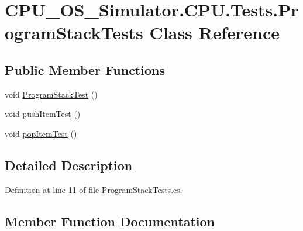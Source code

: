 \hypertarget{class_c_p_u___o_s___simulator_1_1_c_p_u_1_1_tests_1_1_program_stack_tests}{}\section{C\+P\+U\+\_\+\+O\+S\+\_\+\+Simulator.\+C\+P\+U.\+Tests.\+Program\+Stack\+Tests Class Reference}
\label{class_c_p_u___o_s___simulator_1_1_c_p_u_1_1_tests_1_1_program_stack_tests}
\subsection*{Public Member Functions}
\begin{DoxyCompactItemize}
\item 
void \hyperlink{class_c_p_u___o_s___simulator_1_1_c_p_u_1_1_tests_1_1_program_stack_tests_ae3a306f6e91d99a537f07fc4a4177c84}{Program\+Stack\+Test} ()
\item 
void \hyperlink{class_c_p_u___o_s___simulator_1_1_c_p_u_1_1_tests_1_1_program_stack_tests_aa0f5fc338f3b32423b71181218721c40}{push\+Item\+Test} ()
\item 
void \hyperlink{class_c_p_u___o_s___simulator_1_1_c_p_u_1_1_tests_1_1_program_stack_tests_ab98851c55e2cb5ce81feaae1e717b3d4}{pop\+Item\+Test} ()
\end{DoxyCompactItemize}


\subsection{Detailed Description}


Definition at line 11 of file Program\+Stack\+Tests.\+cs.



\subsection{Member Function Documentation}
\hypertarget{class_c_p_u___o_s___simulator_1_1_c_p_u_1_1_tests_1_1_program_stack_tests_ab98851c55e2cb5ce81feaae1e717b3d4}{}
